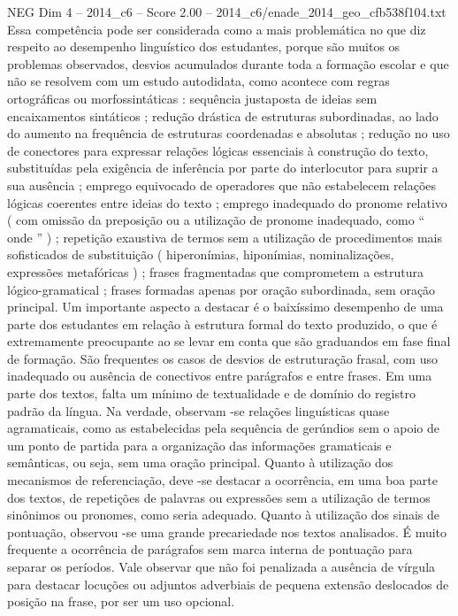 \begin{textsample}{NEG Dim 4 – 2014\_c6 – Score 2.00 – 2014\_c6/enade\_2014\_geo\_cfb538f104.txt}
Essa competência pode ser considerada como a mais problemática no que diz respeito ao desempenho linguístico dos estudantes, porque são muitos os problemas observados, desvios acumulados durante toda a formação escolar e que não se resolvem com um estudo autodidata, como acontece com regras ortográficas ou morfossintáticas : sequência justaposta de ideias sem encaixamentos sintáticos ; redução drástica de estruturas subordinadas, ao lado do aumento na frequência de estruturas coordenadas e absolutas ; redução no uso de conectores para expressar relações lógicas essenciais à construção do texto, substituídas pela exigência de inferência por parte do interlocutor para suprir a sua ausência ; emprego equivocado de operadores que não estabelecem relações lógicas coerentes entre ideias do texto ; emprego inadequado do pronome relativo ( com omissão da preposição ou a utilização de pronome inadequado, como “ onde ” ) ; repetição exaustiva de termos sem a utilização de procedimentos mais sofisticados de substituição ( hiperonímias, hiponímias, nominalizações, expressões metafóricas ) ; frases fragmentadas que comprometem a estrutura lógico-gramatical ; frases formadas apenas por oração subordinada, sem oração principal.
Um importante aspecto a destacar é o baixíssimo desempenho de uma parte dos estudantes em relação à estrutura formal do texto produzido, o que é extremamente preocupante ao se levar em conta que são graduandos em fase final de formação.
São frequentes os casos de desvios de estruturação frasal, com uso inadequado ou ausência de conectivos entre parágrafos e entre frases.
Em uma parte dos textos, falta um mínimo de textualidade e de domínio do registro padrão da língua.
Na verdade, observam -se relações linguísticas quase agramaticais, como as estabelecidas pela sequência de gerúndios sem o apoio de um ponto de partida para a organização das informações gramaticais e semânticas, ou seja, sem uma oração principal.
Quanto à utilização dos mecanismos de referenciação, deve -se destacar a ocorrência, em uma boa parte dos textos, de repetições de palavras ou expressões sem a utilização de termos sinônimos ou pronomes, como seria adequado.
Quanto à utilização dos sinais de pontuação, observou -se uma grande precariedade nos textos analisados.
É muito frequente a ocorrência de parágrafos sem marca interna de pontuação para separar os períodos.
Vale observar que não foi penalizada a ausência de vírgula para destacar locuções ou adjuntos adverbiais de pequena extensão deslocados de posição na frase, por ser um uso opcional.

\end{textsample}
